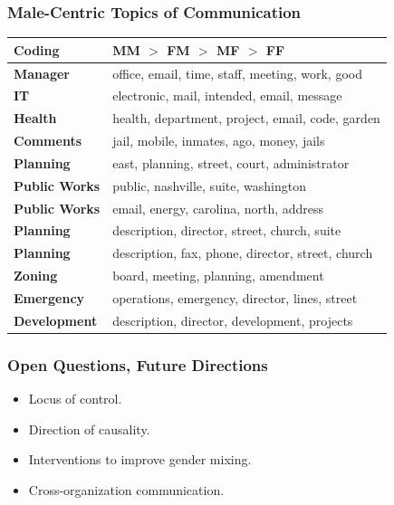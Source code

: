 \documentclass[xcolor={table}]{beamer}
\newenvironment{changemargin}[2]{%
  \begin{list}{}{%
    \setlength{\topsep}{0pt}%
    \setlength{\leftmargin}{#1}%
    \setlength{\rightmargin}{#2}%
    \setlength{\listparindent}{\parindent}%
    \setlength{\itemindent}{\parindent}%
    \setlength{\parsep}{\parskip}%
  }%
  \item[]}{\end{list}}
\begin{document}
\begin{frame}\frametitle{Male-Centric Topics of Communication}
	
	
\begin{changemargin}{-.9cm}{ -1cm}	
	\centering
		\begin{tabular}{ll}
			\toprule
			Coding & MM $>$ FM $>$ MF $>$ FF\\
			\midrule

	\textbf{Manager} & office, email, time, staff, meeting, work, good\\ 

	\textbf{IT} & electronic, mail, intended, email, message\\ 

	\textbf{Health} & health, department, project, email, code, garden\\ 


	\textbf{Comments} & jail, mobile, inmates, ago, money, jails\\ 

	\textbf{Planning} & east, planning, street, court, administrator\\ 


	\textbf{Public Works} & public, nashville, suite, washington\\ 


	\textbf{Public Works} & email, energy, carolina, north, address\\ 


	\textbf{Planning} & description, director, street, church, suite\\ 


	\textbf{Planning} & description, fax, phone, director, street, church\\ 


	\textbf{Zoning} & board, meeting, planning, amendment\\ 


	\textbf{Emergency} & operations, emergency, director, lines, street\\ 


	\textbf{Development} & description, director, development, projects\\ 

			\bottomrule
		\end{tabular}
		\end{changemargin}
\end{frame}



\begin{frame}\frametitle{Open Questions, Future Directions}
	\LARGE
	\begin{itemize}
		\item Locus of control. 
		\vspace*{.3in}
		\item Direction of causality.
		\vspace*{.3in}
		\item Interventions to improve gender mixing. 
		\vspace*{.3in}
		\item Cross-organization communication.
	\end{itemize}
\end{frame}
\end{document}
